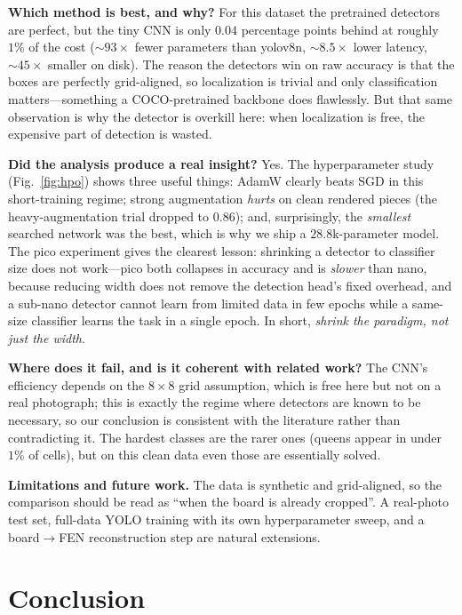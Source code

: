 \documentclass[10pt,twocolumn,a4paper]{article}
\begin{document}
	\textbf{Which method is best, and why?} For this dataset the pretrained detectors are perfect, but the tiny CNN is only $0.04$ percentage points behind at roughly $1\%$ of the cost ($\sim 93\times$ fewer parameters than yolov8n, $\sim 8.5\times$ lower latency, $\sim 45\times$ smaller on disk). The reason the detectors win on raw accuracy is that the boxes are perfectly grid-aligned, so localization is trivial and only classification matters---something a COCO-pretrained backbone does flawlessly. But that same observation is why the detector is overkill here: when localization is free, the expensive part of detection is wasted.

	\textbf{Did the analysis produce a real insight?} Yes. The hyperparameter study (Fig.~\ref{fig:hpo}) shows three useful things: AdamW clearly beats SGD in this short-training regime; strong augmentation \emph{hurts} on clean rendered pieces (the heavy-augmentation trial dropped to $0.86$); and, surprisingly, the \emph{smallest} searched network was the best, which is why we ship a $28.8$k-parameter model. The pico experiment gives the clearest lesson: shrinking a detector to classifier size does not work---pico both collapses in accuracy and is \emph{slower} than nano, because reducing width does not remove the detection head's fixed overhead, and a sub-nano detector cannot learn from limited data in few epochs while a same-size classifier learns the task in a single epoch. In short, \emph{shrink the paradigm, not just the width}.

	\textbf{Where does it fail, and is it coherent with related work?} The CNN's efficiency depends on the $8\times8$ grid assumption, which is free here but not on a real photograph; this is exactly the regime where detectors are known to be necessary, so our conclusion is consistent with the literature rather than contradicting it. The hardest classes are the rarer ones (queens appear in under $1\%$ of cells), but on this clean data even those are essentially solved.

	\textbf{Limitations and future work.} The data is synthetic and grid-aligned, so the comparison should be read as ``when the board is already cropped''. A real-photo test set, full-data YOLO training with its own hyperparameter sweep, and a board$\to$FEN reconstruction step are natural extensions.

	\section{Conclusion}
	\label{sec:conclusion}
\end{document}
